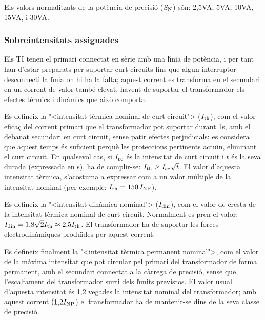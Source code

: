  Els valors normalitzats de la pot\`{e}ncia de precisi\'{o}
 ($S_\mathrm{N}$) s\'{o}n: 2,5\unit{VA}, 5\unit{VA}, 10\unit{VA}, 15\unit{VA}, i 30\unit{VA}.

\subsubsection{Sobreintensitats  assignades}

 Els TI
tenen el primari connectat en s\`{e}rie amb una l\'{\i}nia de pot\`{e}ncia, i per tant han
d'estar preparats per suportar curt circuits fins que algun
interruptor desconnecti la l\'{\i}nia on hi ha la falta; aquest
corrent es transforma en el secundari en un corrent de valor
tamb\'{e} elevat, havent de suportar el transformador els efectes t\`{e}rmics
i din\`{a}mics que aix\`{o} comporta.

Es defineix la {"<}intensitat t\`{e}rmica nominal de curt circuit{">}
($I_\mathrm{th}$), com el valor efica\c{c} del  corrent primari que el
transformador pot suportar durant 1\unit{s}, amb el debanat
secundari en curt circuit, sense patir efectes perjudicials; es
considera que aquest temps \'{e}s suficient perqu\`{e} les proteccions
pertinents actu\"{\i}n, eliminant el curt circuit. En qualsevol cas, si
$I_\mathrm{cc}$ \'{e}s la intensitat de curt circuit i $t$ \'{e}s la seva durada
(expressada en s), ha de complir-se: $I_\mathrm{th}\geq
I_\mathrm{cc}\sqrt{t}$. El valor d'aquesta intensitat t\`{e}rmica,
s'acostuma a expressar com a un valor m\'{u}ltiple de la intensitat
nominal (per exemple: $I_\mathrm{th}=150\,I_\mathrm{NP}$).

Es defineix la {"<}intensitat din\`{a}mica nominal{">} ($I_\mathrm{din}$), com el
valor de cresta de la intensitat t\`{e}rmica nominal de curt circuit.
Normalment es pren el valor: $I_\mathrm{din} =
1{,}8\sqrt{2}I_\mathrm{th}\approx2{,}5I_\mathrm{th}$. El transformador ha de
suportar les forces electrodin\`{a}miques produ\"{\i}des per aquest corrent.

Es defineix finalment la {"<}intensitat t\`{e}rmica permanent nominal{">}, com
el valor de la m\`{a}xima intensitat que pot circular pel primari del
transformador  de forma permanent, amb el secundari connectat a la
c\`{a}rrega de precisi\'{o}, sense que l'escalfament del transformador surti
dels l\'{\i}mits previstos. El valor usual d'aquesta intensitat \'{e}s 1,2
vegades la intensitat nominal del transformador; amb aquest corrent
($1{,}2I_\mathrm{NP}$)  el transformador ha de mantenir-se dins de la
seva classe de precisi\'{o}.

